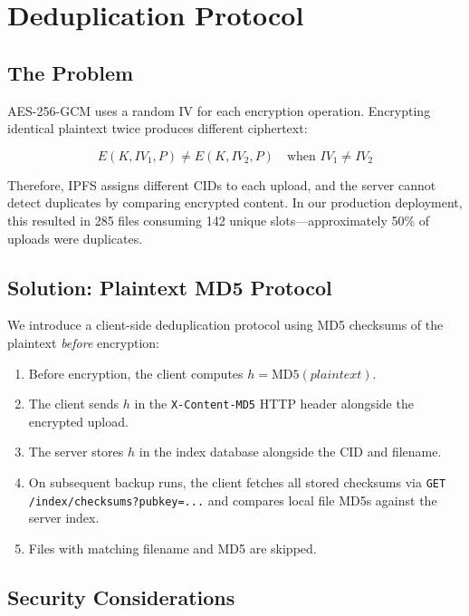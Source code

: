 \documentclass[11pt,a4paper]{article}
\begin{document}
\section{Deduplication Protocol}

\subsection{The Problem}

AES-256-GCM uses a random IV for each encryption operation. Encrypting identical plaintext twice produces different ciphertext:

\begin{equation}
    E(K, IV_1, P) \neq E(K, IV_2, P) \quad \text{when } IV_1 \neq IV_2
\end{equation}

Therefore, IPFS assigns different CIDs to each upload, and the server cannot detect duplicates by comparing encrypted content. In our production deployment, this resulted in 285 files consuming 142 unique slots---approximately 50\% of uploads were duplicates.

\subsection{Solution: Plaintext MD5 Protocol}

We introduce a client-side deduplication protocol using MD5 checksums of the plaintext \textit{before} encryption:

\begin{enumerate}
    \item Before encryption, the client computes $h = \text{MD5}(plaintext)$.
    \item The client sends $h$ in the \texttt{X-Content-MD5} HTTP header alongside the encrypted upload.
    \item The server stores $h$ in the index database alongside the CID and filename.
    \item On subsequent backup runs, the client fetches all stored checksums via \texttt{GET /index/checksums?pubkey=...} and compares local file MD5s against the server index.
    \item Files with matching filename and MD5 are skipped.
\end{enumerate}

\subsection{Security Considerations}
\end{document}
